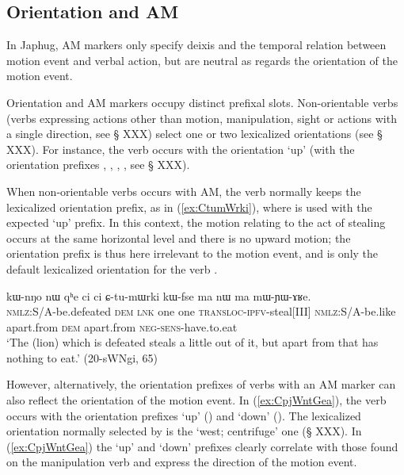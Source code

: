 \subsection{Orientation and AM}
In Japhug, AM markers only specify deixis and the temporal relation between motion event and verbal action, but are neutral as regards the orientation of the motion event.

Orientation and AM markers occupy distinct prefixal slots. Non-orientable verbs (verbs expressing actions other than motion, manipulation, sight or actions with a single direction, see § XXX) select one or two lexicalized orientations (see § XXX). For instance, the verb  occurs with the orientation `up' (with the orientation prefixes , , , , see § XXX). 

When non-orientable verbs occurs with AM, the verb normally keeps the lexicalized orientation prefix, as in (\ref{ex:CtumWrki}), where  is used with the expected  `up' prefix. In this context, the motion relating to the act of stealing occurs at the same horizontal level and there is no upward motion; the orientation prefix is thus here irrelevant to the motion event, and is only the default lexicalized orientation for the verb .

\begin{exe}
\ex \label{ex:CtumWrki}
 \gll kɯ-nŋo nɯ qʰe ci ci ɕ-tu-mɯrki kɯ-fse ma nɯ ma mɯ-ɲɯ-ɤʁe. \\
\textsc{nmlz}:S/A-be.defeated \textsc{dem} \textsc{lnk} one one \textsc{transloc}-\textsc{ipfv}-steal[III] \textsc{nmlz}:S/A-be.like apart.from \textsc{dem} apart.from \textsc{neg}-\textsc{sens}-have.to.eat \\
\glt `The (lion) which is defeated steals a little out of it, but apart from that has nothing to eat.' (20-sWNgi, 65)
\end{exe}

However, alternatively, the orientation prefixes of verbs with an AM marker can also reflect the orientation of the motion event. In (\ref{ex:CpjWntGea}), the verb  occurs with the orientation prefixes `up' () and `down'  (). The lexicalized orientation normally selected by   is the `west; centrifuge' one (§ XXX). In (\ref{ex:CpjWntGea}) the `up' and `down' prefixes clearly correlate with those found on the manipulation verb  and express the direction of the motion event.

